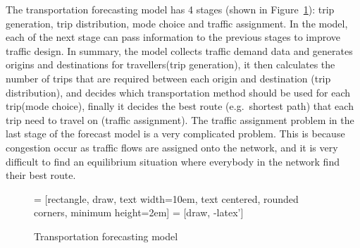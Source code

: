 The transportation forecasting model has 4 stages (shown in Figure~\ref{fig:model}):
trip generation, trip distribution, mode choice and traffic assignment.
In the model,
each of the next stage can pass information to the previous stages to improve traffic design.
In summary, 
the model collects traffic demand data and 
generates origins and destinations for travellers(trip generation),
it then calculates the number of trips that are required between each origin and destination (trip distribution),
and decides which transportation method should be used for each trip(mode choice),
finally it decides the best route (e.g.\ shortest path) that each trip need to travel on (traffic assignment).
The traffic assignment problem in the last stage of the forecast model is a very complicated problem.
This is because congestion occur as traffic flows are assigned onto the network,
and it is very difficult to find an equilibrium situation where everybody in the network find their best route.

\begin{figure}[H]
    \centering
     = [rectangle, draw, text width=10em, text centered, rounded corners, minimum height=2em]
     = [draw, -latex']
    \caption{Transportation forecasting model}
    \label{fig:model}
\end{figure}



